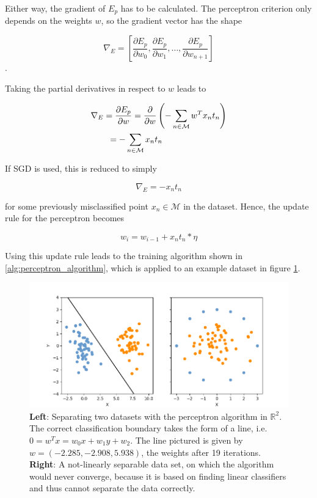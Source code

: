 Either way, the gradient of $E_p$ has to be calculated. The perceptron criterion only depends on the weights $w$, so the gradient vector has the shape

\[ \nabla_E = \left[ \frac{\partial E_p}{\partial w_0}, \frac{\partial E_p}{\partial w_1}, \dots, \frac{\partial E_p}{\partial w_{n+1}} \right ] \].

Taking the partial derivatives in respect to $w$ leads to

\begin{align}
 	\hspace{2em}&\hspace{-2em} \nabla_E = \frac{\partial E_p}{\partial w} = \frac{\partial}{\partial w} \left (- \sum \limits_{n \in \mathcal{M}} w^T x_n t_n \right ) \\
 	&= -\sum \limits_{n \in \mathcal{M}} x_n t_n
\end{align}

\noindent If SGD is used, this is reduced to simply

\[ \nabla_E = -x_n t_n\]

\noindent for some previously misclassified point $x_n \in \mathcal{M}$ in the dataset. Hence, the update rule for the perceptron becomes

\[w_i = w_{i - 1} + x_n t_n * \eta\]

\noindent Using this update rule leads to the training algorithm shown in \ref{alg:perceptron_algorithm}, which is applied to an example dataset in figure \ref{fig:perceptron}.

\begin {figure}[!ht]
	\begin{center}
		\includegraphics[scale=0.6]{img/fig_perceptron}
	\end{center}
	\caption{\textbf{Left}: Separating two datasets with the perceptron algorithm in $\mathbb{R}^2$. The correct classification boundary takes the form of a line, i.e. $0 = w^{T}x = w_0 x + w_1 y + w_2$. The line pictured is given by $w = (-2.285, -2.908, 5.938)$, the weights after 19 iterations. \textbf{Right}: A not-linearly separable data set, on which the algorithm would never converge, because it is based on finding linear classifiers and thus cannot separate the data correctly.}
	\label{fig:perceptron}
\end {figure}

